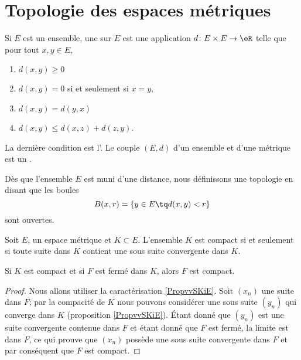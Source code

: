 					\section{Topologie des espaces métriques}

Si $E$ est un ensemble, une  sur $E$ est une application $d\colon E\times E\to \eR$ telle que pour tout $x,y\in E$,
\begin{enumerate}

\item
$d(x,y)\geq 0$

\item
$d(x,y)=0$ si et seulement si $x=y$,

\item
$d(x,y)=d(y,x)$

\item
$d(x,y)\leq d(x,z)+d(z,y)$.

\end{enumerate}
La dernière condition est l'. Le couple $(E,d)$ d'un ensemble et d'une métrique est un .

Dès que l'ensemble $E$ est muni d'une distance, nous définissons une topologie en disant que les boules
\begin{equation}
	B(x,r)=\{ y\in E\tq d(x,y)<r \}
\end{equation}
sont ouvertes.

\begin{proposition} \label{PropvvSKiE}
    Soit \( E\), un espace métrique et \( K\subset E\). L'ensemble \( K\) est compact si et seulement si toute suite dans \( K\) contient une sous suite convergente dans \( K\).
\end{proposition}

\begin{lemma}   \label{LemnAeACf}
    Si \( K\) est compact et si \( F\) est fermé dans \( K\), alors \( F\) est compact.
\end{lemma}

\begin{proof}
    Nous allons utiliser la caractérisation \ref{PropvvSKiE}. Soit \( (x_n)\) une suite dans \( F\); par la compacité de \( K\) nous pouvons considérer une sous suite \( (y_n)\) qui converge dans \( K\) (proposition \ref{PropvvSKiE}). Étant donné que \( (y_n)\) est une suite convergente contenue dans \( F\) et étant donné que \( F\) est fermé, la limite est dans \( F\), ce qui prouve que \( (x_n)\) possède une sous suite convergente dans $F$ et par conséquent que \( F\) est compact.
\end{proof}

